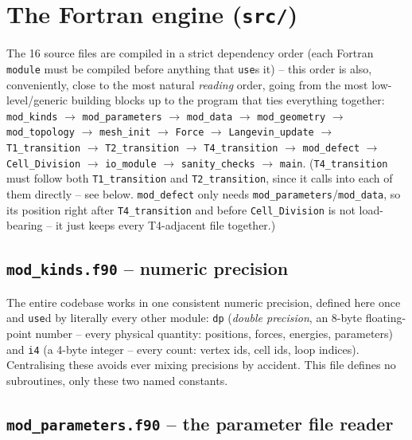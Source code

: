 \documentclass[11pt,a4paper]{report}
\begin{document}
\section{The Fortran engine (\texttt{src/})}
\label{sec:src-code}
The 16 source files are compiled in a strict dependency order (each
Fortran \texttt{module} must be compiled before anything that
\texttt{use}s it) -- this order is also, conveniently, close to the
most natural \emph{reading} order, going from the most low-level/generic
building blocks up to the program that ties everything together:
\texttt{mod\_kinds} $\rightarrow$ \texttt{mod\_parameters} $\rightarrow$
\texttt{mod\_data} $\rightarrow$ \texttt{mod\_geometry} $\rightarrow$
\texttt{mod\_topology} $\rightarrow$ \texttt{mesh\_init} $\rightarrow$
\texttt{Force} $\rightarrow$ \texttt{Langevin\_update} $\rightarrow$
\texttt{T1\_transition} $\rightarrow$ \texttt{T2\_transition}
$\rightarrow$ \texttt{T4\_transition} $\rightarrow$ \texttt{mod\_defect}
$\rightarrow$ \texttt{Cell\_Division}
$\rightarrow$ \texttt{io\_module} $\rightarrow$ \texttt{sanity\_checks}
$\rightarrow$ \texttt{main}. (\texttt{T4\_transition} must follow both
\texttt{T1\_transition} and \texttt{T2\_transition}, since it calls
into each of them directly -- see below. \texttt{mod\_defect} only
needs \texttt{mod\_parameters}/\texttt{mod\_data}, so its position
right after \texttt{T4\_transition} and before \texttt{Cell\_Division}
is not load-bearing -- it just keeps every T4-adjacent file together.)

\subsection{\texttt{mod\_kinds.f90} -- numeric precision}
The entire codebase works in one consistent numeric precision, defined
here once and \texttt{use}d by literally every other module:
\texttt{dp} (\emph{double precision}, an 8-byte floating-point number
-- every physical quantity: positions, forces, energies, parameters)
and \texttt{i4} (a 4-byte integer -- every count: vertex ids, cell ids,
loop indices). Centralising these avoids ever mixing precisions by
accident. This file defines no subroutines, only these two named
constants.

\subsection{\texttt{mod\_parameters.f90} -- the parameter file reader}
\end{document}
